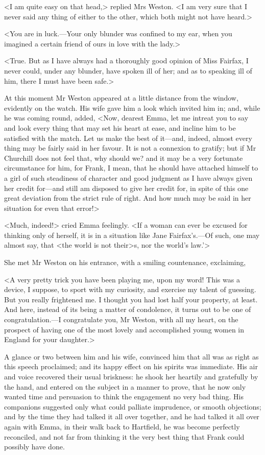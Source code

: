 <I am quite easy on that head,> replied Mrs Weston. <I am very sure that I never said any thing of either to the other, which both might not have heard.>

<You are in luck.—Your only blunder was confined to my ear, when you imagined a certain friend of ours in love with the lady.>

<True. But as I have always had a thoroughly good opinion of Miss Fairfax, I never could, under any blunder, have spoken ill of her; and as to speaking ill of him, there I must have been safe.>

At this moment Mr Weston appeared at a little distance from the window, evidently on the watch. His wife gave him a look which invited him in; and, while he was coming round, added, <Now, dearest Emma, let me intreat you to say and look every thing that may set his heart at ease, and incline him to be satisfied with the match. Let us make the best of it—and, indeed, almost every thing may be fairly said in her favour. It is not a connexion to gratify; but if Mr Churchill does not feel that, why should we? and it may be a very fortunate circumstance for him, for Frank, I mean, that he should have attached himself to a girl of such steadiness of character and good judgment as I have always given her credit for—and still am disposed to give her credit for, in spite of this one great deviation from the strict rule of right. And how much may be said in her situation for even that error!>

<Much, indeed!> cried Emma feelingly. <If a woman can ever be excused for thinking only of herself, it is in a situation like Jane Fairfax's.—Of such, one may almost say, that <the world is not their>s, nor the world's law.'>

She met Mr Weston on his entrance, with a smiling countenance, exclaiming,

<A very pretty trick you have been playing me, upon my word! This was a device, I suppose, to sport with my curiosity, and exercise my talent of guessing. But you really frightened me. I thought you had lost half your property, at least. And here, instead of its being a matter of condolence, it turns out to be one of congratulation.—I congratulate you, Mr Weston, with all my heart, on the prospect of having one of the most lovely and accomplished young women in England for your daughter.>

A glance or two between him and his wife, convinced him that all was as right as this speech proclaimed; and its happy effect on his spirits was immediate. His air and voice recovered their usual briskness: he shook her heartily and gratefully by the hand, and entered on the subject in a manner to prove, that he now only wanted time and persuasion to think the engagement no very bad thing. His companions suggested only what could palliate imprudence, or smooth objections; and by the time they had talked it all over together, and he had talked it all over again with Emma, in their walk back to Hartfield, he was become perfectly reconciled, and not far from thinking it the very best thing that Frank could possibly have done.